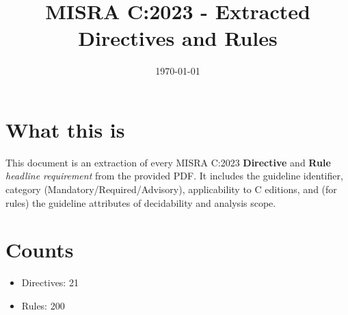 \documentclass[11pt]{article}
\title{MISRA C:2023 - Extracted Directives and Rules}
\author{}
\date{\today}
\begin{document}
\maketitle

\section*{What this is}
This document is an extraction of every MISRA C:2023 \textbf{Directive} and \textbf{Rule} \emph{headline requirement} from the provided PDF.
It includes the guideline identifier, category (Mandatory/Required/Advisory), applicability to C editions, and (for rules) the guideline attributes of decidability and analysis scope.

\section*{Counts}
\begin{itemize}
\item Directives: 21
\item Rules: 200
\end{itemize}
\end{document}
